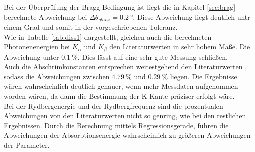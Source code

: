 Bei der Überprüfung der Bragg-Bedingung ist liegt die in Kapitel \ref{sec:brag} berechnete Abweichung bei $\Delta\theta_{glanz}=\SI{0.2}{\degree}$.
Diese Abweichung liegt deutlich untr einem Grad und somit in der vorgeschriebenen Toleranz. 
\\\noindent
Wie in Tabelle \ref{tab:diss1} dargestellt, gleichen auch die berechneten Photonenenergien bei $K_\alpha$ und $K_\beta$
den Literaturwerten in sehr hohem Maße. Die Abweichung unter $\SI{0.1}{\percent}$. Dies lässt auf eine sehr gute Messung schließen.
\\\noindent
Auch die Abschrimkonstanten entsprechen weitestgehend den Literaturwerten \cite{AP05}, sodass die Abweichungen zwischen $\SI{4.79}{\percent}$
und $\SI{0.29}{\percent}$ liegen. Die Ergebnisse wären wahrscheinlich deutlich genauer, wenn mehr Messdaten aufgenommen worden wären, da 
dann die Bestimmung der K-Kante präziser erfolgt wäre.  
\\\noindent
Bei der Rydbergenergie und der Rydbergfrequenz sind die prozentualen Abweichungen von den Literaturwerten \cite{AP06} nicht so genring, wie bei 
den restlichen Ergebnissen. Durch die Berechnung mittels Regressionsgerade, führen die Abweichungen der Absorbtionsenergie wahrscheinlich 
zu größeren Abweichungen der Parameter. 